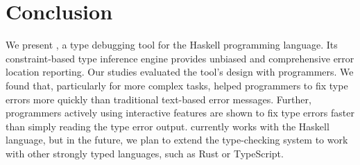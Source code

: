 
\section{Conclusion}

We present \chameleon{}, a type debugging tool for the Haskell programming language. Its constraint-based type inference engine provides unbiased and comprehensive error location reporting. 
Our studies evaluated the tool's design with programmers. We found that, particularly for more complex tasks, \chameleon{} helped programmers to fix type errors more quickly than traditional text-based error messages. Further, programmers actively using \chameleon{} interactive features are shown to fix type errors faster than simply reading the type error output.
\chameleon{} currently works with the Haskell language, but in the future, we plan to extend the type-checking system to work with other strongly typed languages, such as Rust or TypeScript.


\goodbreak\noindent